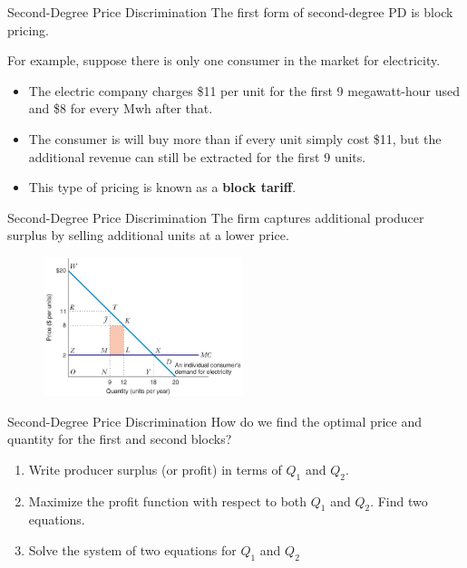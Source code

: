 \documentclass[11pt,t]{beamer}
\begin{document}
\begin{frame}{Second-Degree Price Discrimination}
  The first form of second-degree PD is block pricing.

  \bigskip
  For example, suppose there is only one consumer in the market for electricity.

  \begin{itemize}
    \item The electric company charges \$11 per unit for the first 9 megawatt-hour used and \$8 for every Mwh after that.
    \item The consumer is will buy more than if every unit simply cost \$11, but the additional revenue can still be extracted for the first 9 units.
    \item This type of pricing is known as a \textbf{block tariff}.
  \end{itemize}
\end{frame}

\begin{frame}{Second-Degree Price Discrimination}
  The firm captures additional producer surplus by selling additional units at a lower price.
  \begin{figure}
    \includegraphics[width=220px]{figures/fig12_4.jpg}
  \end{figure}
\end{frame}

\begin{frame}{Second-Degree Price Discrimination}
  How do we find the optimal price and quantity for the first and second blocks?
  
  \begin{enumerate}
    \item Write producer surplus (or profit) in terms of $Q_1$ and $Q_2$.

    \item Maximize the profit function with respect to both $Q_1$ and $Q_2$. Find two equations.

    \item Solve the system of two equations for $Q_1$ and $Q_2$
  \end{enumerate}
\end{frame}
\end{document}
